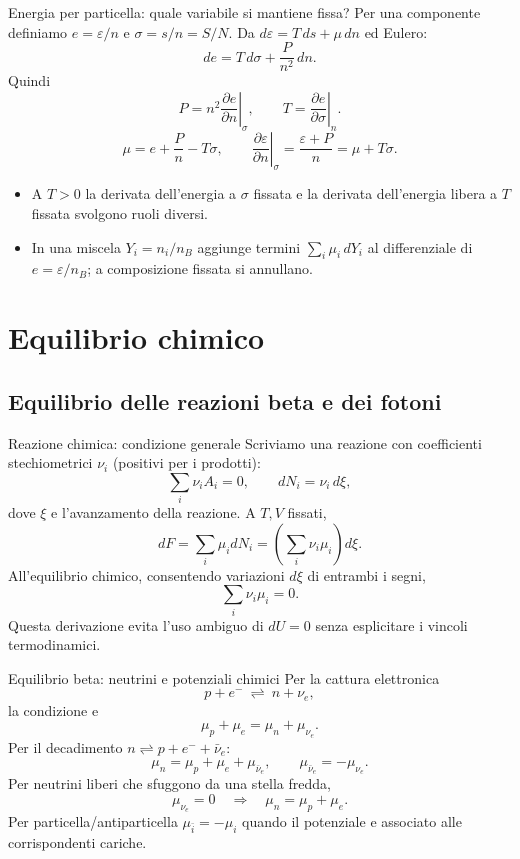 \begin{frame}[t]{Energia per particella: quale variabile si mantiene fissa?}
\vspace*{3mm}
\small
Per una componente definiamo $e=\varepsilon/n$ e $\sigma=s/n=S/N$.
Da $d\varepsilon=T\,ds+\mu\,dn$ ed Eulero:
\[
\boxed{de=T\,d\sigma+\frac{P}{n^2}\,dn.}
\]
Quindi
\[
\boxed{P=n^2\left.\frac{\partial e}{\partial n}\right|_\sigma,
\qquad T=\left.\frac{\partial e}{\partial\sigma}\right|_n.}
\]
\[
\mu=e+\frac Pn-T\sigma,\qquad
\left.\frac{\partial\varepsilon}{\partial n}\right|_\sigma
=\frac{\varepsilon+P}{n}=\mu+T\sigma.
\]
\begin{itemize}
\item A $T>0$ la derivata dell'energia a $\sigma$ fissata e la derivata
dell'energia libera a $T$ fissata svolgono ruoli diversi.
\item In una miscela $Y_i=n_i/n_B$ aggiunge termini $\sum_i\mu_i\,dY_i$
al differenziale di $e=\varepsilon/n_B$; a composizione fissata si annullano.
\end{itemize}
\end{frame}

\section{Equilibrio chimico}

\subsection{Equilibrio delle reazioni beta e dei fotoni}

\begin{frame}[t]{Reazione chimica: condizione generale}
\vspace*{3mm}
\small
Scriviamo una reazione con coefficienti stechiometrici $\nu_i$ (positivi per i prodotti):
\[
\sum_i\nu_i A_i=0,\qquad dN_i=\nu_i\,d\xi,
\]
dove $\xi$ e l'avanzamento della reazione.
A $T,V$ fissati,
\[
dF=\sum_i\mu_i dN_i=\left(\sum_i\nu_i\mu_i\right)d\xi.
\]
All'equilibrio chimico, consentendo variazioni $d\xi$ di entrambi i segni,
\[
\boxed{\sum_i\nu_i\mu_i=0.}
\]
Questa derivazione evita l'uso ambiguo di $dU=0$ senza esplicitare i vincoli termodinamici.
\end{frame}

\begin{frame}[t]{Equilibrio beta: neutrini e potenziali chimici}
\vspace*{3mm}
\small
Per la cattura elettronica
\[
p+e^-\ \rightleftharpoons\ n+\nu_e,
\]
la condizione e
\[
\mu_p+\mu_e=\mu_n+\mu_{\nu_e}.
\]
Per il decadimento $n\rightleftharpoons p+e^-+\bar\nu_e$:
\[
\mu_n=\mu_p+\mu_e+\mu_{\bar\nu_e},
\qquad\mu_{\bar\nu_e}=-\mu_{\nu_e}.
\]
Per neutrini liberi che sfuggono da una stella fredda,
\[
\boxed{\mu_{\nu_e}=0\quad\Longrightarrow\quad\mu_n=\mu_p+\mu_e.}
\]
Per particella/antiparticella $\mu_{\bar i}=-\mu_i$ quando il potenziale e associato alle corrispondenti cariche.
\end{frame}

